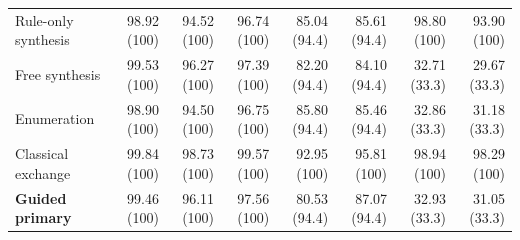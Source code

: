\begin{table}[t]
\begin{tabular}{lrrrrrrr}
Rule-only synthesis & 98.92 (100) & 94.52 (100) & 96.74 (100) & 85.04 (94.4) & 85.61 (94.4) & 98.80 (100) & 93.90 (100) \\
Free synthesis & 99.53 (100) & 96.27 (100) & 97.39 (100) & 82.20 (94.4) & 84.10 (94.4) & 32.71 (33.3) & 29.67 (33.3) \\
Enumeration & 98.90 (100) & 94.50 (100) & 96.75 (100) & 85.80 (94.4) & 85.46 (94.4) & 32.86 (33.3) & 31.18 (33.3) \\
Classical exchange & 99.84 (100) & 98.73 (100) & 99.57 (100) & 92.95 (100) & 95.81 (100) & 98.94 (100) & 98.29 (100) \\
\rowcolor{blue!7} \textbf{Guided primary} & 99.46 (100) & 96.11 (100) & 97.56 (100) & 80.53 (94.4) & 87.07 (94.4) & 32.93 (33.3) & 31.05 (33.3) \\
\bottomrule
\end{tabular}
\end{table}
